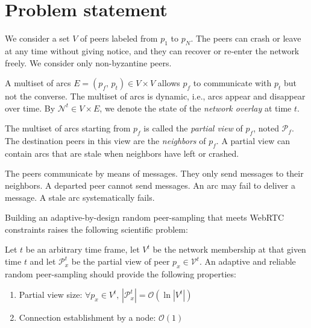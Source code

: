 
\section{Problem statement}
\label{sec:problem}

We consider a set $V$ of peers labeled from $p_1$ to $p_N$.  The peers can
crash or leave at any time without giving notice, and they can recover or
re-enter the network freely. We consider only non-byzantine peers.

A multiset of arcs $E = (p_f,\,p_t) \in V \times V$ allows $p_f$ to
communicate with $p_t$ but not the converse. The multiset of arcs is
dynamic, i.e., arcs appear and disappear over time. By $\mathcal{N}^t
\in V \times E$, we denote the state of the \emph{network overlay} at
time $t$.

The multiset of arcs starting from $p_f$ is called the \emph{partial
  view} of $p_f$, noted $\mathcal{P}_f$. The destination peers in this
view are the \emph{neighbors} of $p_f$. A partial view can contain
arcs that are stale when neighbors have left or crashed.

The peers communicate by means of messages. They only send messages to
their neighbors. A departed peer cannot send messages. An arc may fail
to deliver a message. A stale arc systematically fails.

Building an adaptive-by-design random peer-sampling that meets WebRTC
constraints raises the following scientific problem:
\begin{problem}
  Let $t$ be an arbitrary time frame, let $V^t$ be the network membership at
  that given time $t$ and let $\mathcal{P}_x^t$ be the partial view of peer
  $p_x \in \mathcal{V}^t$.  An adaptive and reliable random peer-sampling should
  provide the following properties:
  \begin{enumerate}
  \item Partial view size: \hfill
    $\forall p_x \in V^t,\, |\mathcal{P}_x^t| = \mathcal{O} (\ln
    |V^t|)$      
  \item Connection establishment by a node: \hfill $\mathcal{O}(1)$
  \end{enumerate}
\end{problem}

